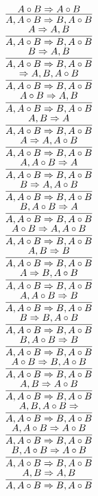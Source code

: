 \documentclass[11pt]{article}
\begin{document}
\begin{center}
\bigskip
\\$\infer{A, A\circ B\Rightarrow B, A\circ B}{A\circ B\Rightarrow A\circ B}$
\bigskip
\\$\infer{A, A\circ B\Rightarrow B, A\circ B}{A\Rightarrow A, B}$
\bigskip
\\$\infer{A, A\circ B\Rightarrow B, A\circ B}{B\Rightarrow A, B}$
\bigskip
\\$\infer{A, A\circ B\Rightarrow B, A\circ B}{\Rightarrow A, B, A\circ B}$
\bigskip
\\$\infer{A, A\circ B\Rightarrow B, A\circ B}{A\circ B\Rightarrow A, B}$
\bigskip
\\$\infer{A, A\circ B\Rightarrow B, A\circ B}{A, B\Rightarrow A}$
\bigskip
\\$\infer{A, A\circ B\Rightarrow B, A\circ B}{A\Rightarrow A, A\circ B}$
\bigskip
\\$\infer{A, A\circ B\Rightarrow B, A\circ B}{A, A\circ B\Rightarrow A}$
\bigskip
\\$\infer{A, A\circ B\Rightarrow B, A\circ B}{B\Rightarrow A, A\circ B}$
\bigskip
\\$\infer{A, A\circ B\Rightarrow B, A\circ B}{B, A\circ B\Rightarrow A}$
\bigskip
\\$\infer{A, A\circ B\Rightarrow B, A\circ B}{A\circ B\Rightarrow A, A\circ B}$
\bigskip
\\$\infer{A, A\circ B\Rightarrow B, A\circ B}{A, B\Rightarrow B}$
\bigskip
\\$\infer{A, A\circ B\Rightarrow B, A\circ B}{A\Rightarrow B, A\circ B}$
\bigskip
\\$\infer{A, A\circ B\Rightarrow B, A\circ B}{A, A\circ B\Rightarrow B}$
\bigskip
\\$\infer{A, A\circ B\Rightarrow B, A\circ B}{B\Rightarrow B, A\circ B}$
\bigskip
\\$\infer{A, A\circ B\Rightarrow B, A\circ B}{B, A\circ B\Rightarrow B}$
\bigskip
\\$\infer{A, A\circ B\Rightarrow B, A\circ B}{A\circ B\Rightarrow B, A\circ B}$
\bigskip
\\$\infer{A, A\circ B\Rightarrow B, A\circ B}{A, B\Rightarrow A\circ B}$
\bigskip
\\$\infer{A, A\circ B\Rightarrow B, A\circ B}{A, B, A\circ B\Rightarrow }$
\bigskip
\\$\infer{A, A\circ B\Rightarrow B, A\circ B}{A, A\circ B\Rightarrow A\circ B}$
\bigskip
\\$\infer{A, A\circ B\Rightarrow B, A\circ B}{B, A\circ B\Rightarrow A\circ B}$
\bigskip
\\$\infer{A, A\circ B\Rightarrow B, A\circ B}{A, B\Rightarrow A, B}$

\end{center}
\end{document}

